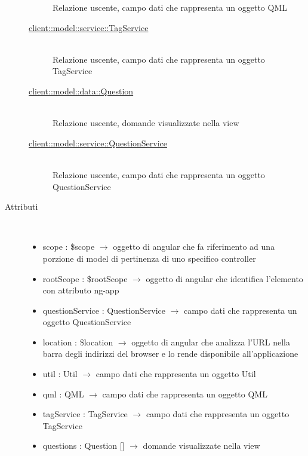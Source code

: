 \begin{description}
\begin{description}
	Relazione uscente, campo dati che rappresenta un oggetto QML
	\item[\hyperlink{client::model::service::TagService}{client::model::service::TagService}] \hfill \\
	Relazione uscente, campo dati che rappresenta un oggetto TagService
	\item[\hyperlink{client::model::data::Question}{client::model::data::Question}] \hfill \\
	Relazione uscente, domande visualizzate nella view
	\item[\hyperlink{client::model::service::QuestionService}{client::model::service::QuestionService}] \hfill \\
	Relazione uscente, campo dati che rappresenta un oggetto QuestionService
\end{description}

\item[Attributi] \hfill \\
\vspace{-7mm}
\begin{itemize}
	\item scope : \$scope $\rightarrow$ oggetto di angular che fa riferimento ad una porzione di model di pertinenza di uno specifico controller
	\item rootScope : \$rootScope $\rightarrow$ oggetto di angular che identifica l’elemento con attributo ng-app
	\item questionService : QuestionService $\rightarrow$ campo dati che rappresenta un oggetto QuestionService
	\item location : \$location $\rightarrow$ oggetto di angular che analizza l'URL nella barra degli indirizzi del browser e lo rende disponibile all'applicazione
	\item util : Util $\rightarrow$ campo dati che rappresenta un oggetto Util
	\item qml : QML $\rightarrow$ campo dati che rappresenta un oggetto QML
	\item tagService : TagService $\rightarrow$ campo dati che rappresenta un oggetto TagService
	\item questions : Question [] $\rightarrow$ domande visualizzate nella view
\end{itemize}


\end{description}
